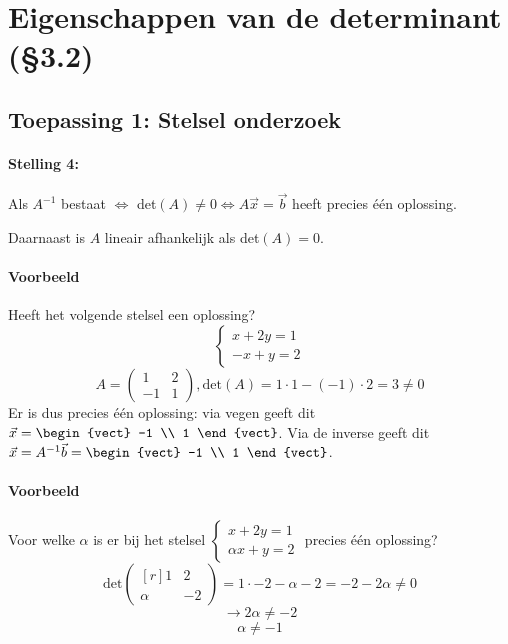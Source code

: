 \section{Eigenschappen van de determinant (\S3.2)}
\subsection{Toepassing 1: Stelsel onderzoek}

\paragraph{Stelling 4:}  Als $A^{-1}$ bestaat $\iff$ det$(A) \neq 0 \iff A \vec{x} = \vec{b}$ heeft precies \'e\'en oplossing.

Daarnaast is $A$ lineair afhankelijk als det$(A) = 0$.

\paragraph{Voorbeeld}
Heeft het volgende stelsel een oplossing?
\[ \left\{ \begin{array}{r}
	x + 2y = 1 \\
	-x + y = 2
\end{array}\right. \]
\[ A = \begin{pmatrix*}1 & 2 \\ -1 & 1 \end{pmatrix*}, \mbox{det}(A) = 1 \cdot 1 - (-1) \cdot 2 = 3 \neq 0 \]
Er is dus precies \'e\'en oplossing: via vegen geeft dit $\vec{x} = \begin{vect} -1 \\ 1 \end{vect}$. Via de inverse geeft dit $\vec{x} = A^{-1} \vec{b} = \begin{vect} -1 \\ 1 \end{vect}$.

\paragraph{Voorbeeld} Voor welke $\alpha$ is er bij het stelsel 
$\left\{ \begin{array}{r}
	x + 2y = 1 \\
	\alpha x + y = 2
\end{array}\right.$ precies \'e\'en oplossing?
\[ \mbox{det}\begin{pmatrix*}[r] 1 & 2 \\ \alpha & -2 \end{pmatrix*} = 1 \cdot -2 - \alpha -2 = -2 - 2 \alpha \neq 0\]
\[ \to 2 \alpha \neq -2 \]
\[ \alpha \neq -1 \]

